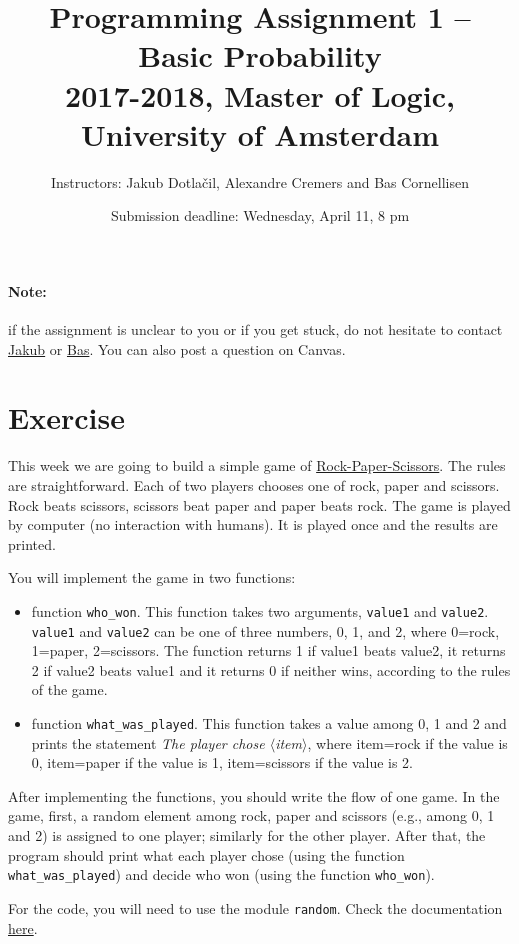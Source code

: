 \documentclass[11pt, a4paper]{article}
\title{Programming Assignment 1 -- Basic Probability\\[2mm]
\large{2017-2018, Master of Logic, University of Amsterdam}}
\author{Instructors: Jakub Dotla\v{c}il, Alexandre Cremers and Bas Cornellisen}
\date{Submission deadline: Wednesday, April 11, 8 pm}
\newcommand{\angles}[1]{$\langle$#1$\rangle$}
\begin{document}
\maketitle

\paragraph{Note:} if the assignment is unclear to you or if you get stuck, do not hesitate to contact \href{mailto:j.dotlacil@uva.nl}{Jakub} or \href{mailto:bjmcornelissen@gmail.com}{Bas}. You can also post a question on Canvas.

\section{Exercise}
This week we are going to build a simple game of \href{https://en.wikipedia.org/wiki/Rock-paper-scissors}{Rock-Paper-Scissors}. The rules are straightforward. Each of two players chooses one of rock, paper and scissors. Rock beats scissors, scissors beat paper and paper beats rock. The game is played by computer (no interaction with humans). It is played once and the results are printed.

You will implement the game in two functions:
\begin{itemize}
    \item function \texttt{who\_won}. This function takes two arguments, \texttt{value1} and \texttt{value2}. \texttt{value1} and \texttt{value2} can be one of three numbers, 0, 1, and 2, where 0=rock, 1=paper, 2=scissors. The function returns 1 if value1 beats value2, it returns 2 if value2 beats value1 and it returns 0 if neither wins, according to the rules of the game.
    \item function \texttt{what\_was\_played}. This function takes a value among 0, 1 and 2 and prints the statement \textit{The player chose \angles{item}}, where item=rock if the value is 0, item=paper if the value is 1, item=scissors if the value is 2.
\end{itemize}

After implementing the functions, you should write the flow of one game. In the game, first, a random element among rock, paper and scissors (e.g., among 0, 1 and 2) is assigned to one player; similarly for the other player. After that, the program should print what each player chose (using the function \texttt{what\_was\_played}) and decide who won (using the function \texttt{who\_won}).

For the code, you will need to use the module \texttt{random}. Check the documentation \href{https://docs.python.org/3/library/random.html}{here}.
\end{document}
